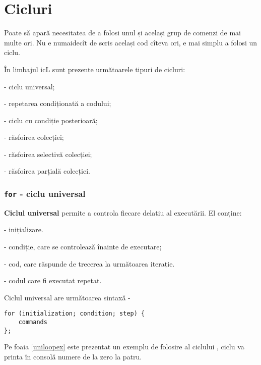 \section{Cicluri}

Poate să apară necesitatea de a folosi unul și același grup de comenzi de mai multe ori. Nu e numaidecît de scris același cod cîteva ori, e mai simplu a folosi un ciclu.

În limbajul icL sunt prezente următoarele tipuri de cicluri:

\begin{icItems}
\item
	 - ciclu universal;
\item
	 - repetarea condiționată a codului;
\item
	 - ciclu cu condiție posterioară;
\item
	 - răsfoirea colecției;
\item
	 - răsfoirea selectivă colecției;
\item
	 - răsfoirea parțială colecției.
\end{icItems}


\subsubsection{\lstinline`for` - ciclu universal}

{\bf Ciclul universal} permite a controla fiecare delatiu al executării. El conține:

\begin{icItems}
\item
	 - inițializare.
\item
	 - condiție, care se controlează înainte de executare;
\item
	 - cod, care răspunde de trecerea la următoarea iterație.
\item
	 - codul care fi executat repetat.
\end{icItems}

Ciclul universal are următoarea sintaxă -
\begin{lstlisting}[numbers=none]
for (initialization; condition; step) {
	commands
};
\end{lstlisting}

Pe foaia \ref{uniloopex} este prezentat un exemplu de folosire al ciclului , ciclu va printa în consolă numere de la zero la patru.

